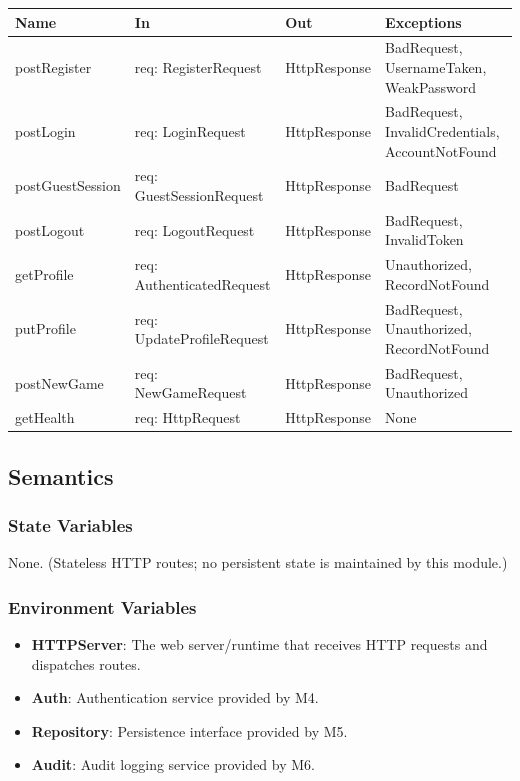 \documentclass[12pt, titlepage]{article}
\begin{document}
\begin{center}
\begin{tabular}{p{4.5cm} p{4.5cm} p{3.5cm} p{3.5cm}}
\toprule
\textbf{Name} & \textbf{In} & \textbf{Out} & \textbf{Exceptions} \\
\midrule
postRegister & req: RegisterRequest & HttpResponse & BadRequest, UsernameTaken, WeakPassword \\
postLogin & req: LoginRequest & HttpResponse & BadRequest, InvalidCredentials, AccountNotFound \\
postGuestSession & req: GuestSessionRequest & HttpResponse & BadRequest \\
postLogout & req: LogoutRequest & HttpResponse & BadRequest, InvalidToken \\
getProfile & req: AuthenticatedRequest & HttpResponse & Unauthorized, RecordNotFound \\
putProfile & req: UpdateProfileRequest & HttpResponse & BadRequest, Unauthorized, RecordNotFound \\
postNewGame & req: NewGameRequest & HttpResponse & BadRequest, Unauthorized \\
getHealth & req: HttpRequest & HttpResponse & None \\
\bottomrule
\end{tabular}
\end{center}

\subsection{Semantics}

\subsubsection{State Variables}
None. (Stateless HTTP routes; no persistent state is maintained by this module.)

\subsubsection{Environment Variables}
\begin{itemize}
    \item \textbf{HTTPServer}: The web server/runtime that receives HTTP requests and dispatches routes.
    \item \textbf{Auth}: Authentication service provided by M4.
    \item \textbf{Repository}: Persistence interface provided by M5.
    \item \textbf{Audit}: Audit logging service provided by M6.
\end{itemize}
\end{document}
